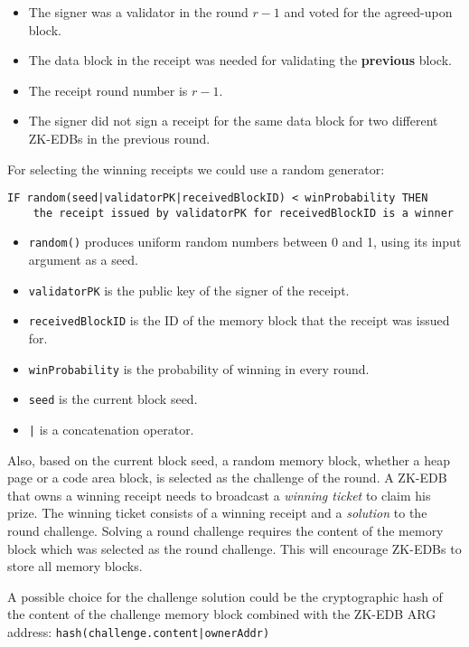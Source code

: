\begin{itemize}
    \item The signer was a validator in the round \(r - 1\) and voted for the agreed-upon block.
    \item The data block in the receipt was needed for validating the \textbf{previous} block.
    \item The receipt round number is \(r - 1\).
    \item The signer did not sign a receipt for the same data block for two different ZK-EDBs in the previous round.
\end{itemize}
For selecting the winning receipts we could use a random generator:
\begin{verbatim}
IF random(seed|validatorPK|receivedBlockID) < winProbability THEN
    the receipt issued by validatorPK for receivedBlockID is a winner
\end{verbatim}
\begin{itemize}
    \item \texttt{random()} produces uniform random numbers between 0 and 1, using its input argument as a seed.
    \item \texttt{validatorPK} is the public key of the signer of the receipt.
    \item \texttt{receivedBlockID} is the ID of the memory block that the receipt was issued for.
    \item \texttt{winProbability} is the probability of winning in every round.
    \item \texttt{seed} is the current block seed.
    \item \texttt{|} is a concatenation operator.
\end{itemize}


Also, based on the current block seed, a random memory block, whether a heap page or a code area block, is
selected as the challenge of the round. A ZK-EDB that owns a winning receipt needs to broadcast a \emph{winning
ticket} to claim his prize. The winning ticket consists of a winning receipt and a \emph{solution} to the round
challenge. Solving a round challenge requires the content of the memory block which was selected as the round
challenge. This will encourage ZK-EDBs to store all memory blocks.

A possible choice for the challenge solution could be the cryptographic hash of the content of the challenge
memory block combined with the ZK-EDB ARG address: \texttt{hash(challenge.content|ownerAddr)}


